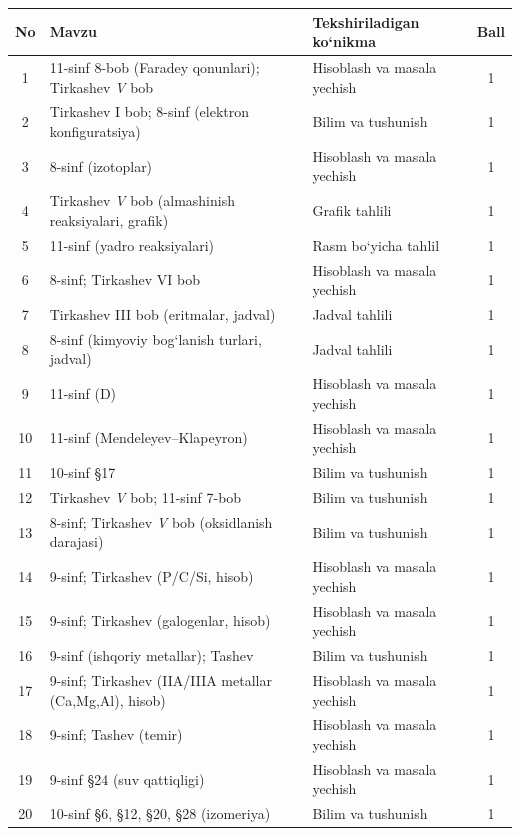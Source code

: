 \documentclass[11pt,a4paper]{article}
\begin{document}
{\small\noindent\begin{longtable}{|c|p{7.2cm}|p{5.4cm}|c|}\hline \textbf{No} & \textbf{Mavzu} & \textbf{Tekshiriladigan ko`nikma} & \textbf{Ball}\\\hline
1 & 11-sinf 8-bob (Faradey qonunlari); Tirkashev \textit{V} bob & Hisoblash va masala yechish & 1\\\hline
2 & Tirkashev I bob; 8-sinf (elektron konfiguratsiya) & Bilim va tushunish & 1\\\hline
3 & 8-sinf (izotoplar) & Hisoblash va masala yechish & 1\\\hline
4 & Tirkashev \textit{V} bob (almashinish reaksiyalari, grafik) & Grafik tahlili & 1\\\hline
5 & 11-sinf (yadro reaksiyalari) & Rasm bo`yicha tahlil & 1\\\hline
6 & 8-sinf; Tirkashev VI bob & Hisoblash va masala yechish & 1\\\hline
7 & Tirkashev III bob (eritmalar, jadval) & Jadval tahlili & 1\\\hline
8 & 8-sinf (kimyoviy bog`lanish turlari, jadval) & Jadval tahlili & 1\\\hline
9 & 11-sinf (D) & Hisoblash va masala yechish & 1\\\hline
10 & 11-sinf (Mendeleyev--Klapeyron) & Hisoblash va masala yechish & 1\\\hline
11 & 10-sinf \S{}17 & Bilim va tushunish & 1\\\hline
12 & Tirkashev \textit{V} bob; 11-sinf 7-bob & Bilim va tushunish & 1\\\hline
13 & 8-sinf; Tirkashev \textit{V} bob (oksidlanish darajasi) & Bilim va tushunish & 1\\\hline
14 & 9-sinf; Tirkashev (P/C/Si, hisob) & Hisoblash va masala yechish & 1\\\hline
15 & 9-sinf; Tirkashev (galogenlar, hisob) & Hisoblash va masala yechish & 1\\\hline
16 & 9-sinf (ishqoriy metallar); Tashev & Bilim va tushunish & 1\\\hline
17 & 9-sinf; Tirkashev (IIA/IIIA metallar (Ca,Mg,Al), hisob) & Hisoblash va masala yechish & 1\\\hline
18 & 9-sinf; Tashev (temir) & Hisoblash va masala yechish & 1\\\hline
19 & 9-sinf \S{}24 (suv qattiqligi) & Hisoblash va masala yechish & 1\\\hline
20 & 10-sinf \S{}6, \S{}12, \S{}20, \S{}28 (izomeriya) & Bilim va tushunish & 1\\\hline

\end{longtable}}
\end{document}
